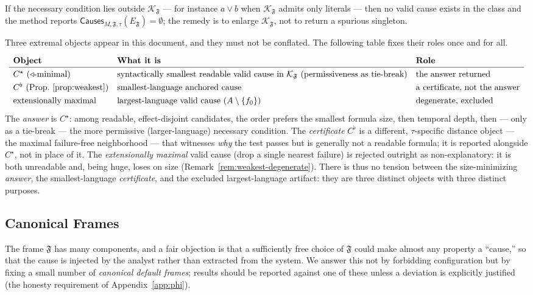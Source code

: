 \documentclass[11pt]{article}
\theoremstyle{remark}
\newcommand{\Frame}{\mathfrak{F}}
\begin{document}
If the necessary condition lies outside \(\mathcal{K}_{\Frame}\) --- for
instance \(a\lor b\) when \(\mathcal{K}_{\Frame}\) admits only literals --- then
no valid cause exists in the class and the method reports
\(\mathsf{Causes}_{M,\Frame,\tau}(E_{\Frame})=\emptyset\); the remedy is to
enlarge \(\mathcal{K}_{\Frame}\), not to return a spurious singleton.

Three extremal objects appear in this document, and they must not be conflated.
The following table fixes their roles once and for all.
\[
\renewcommand{\arraystretch}{1.3}
\begin{array}{lll}
  \textbf{Object} & \textbf{What it is} & \textbf{Role}\\
  \hline
  C^{\star}\ (\triangleleft\text{-minimal}) &
    \text{syntactically smallest readable valid cause in }\mathcal{K}_{\Frame}
    \text{ (permissiveness as tie-break)} &
    \text{the answer returned}\\
  C^{\flat}\ (\text{Prop.~\ref{prop:weakest}}) &
    \text{smallest-language anchored cause} &
    \text{a certificate, not the answer}\\
  \text{extensionally maximal} &
    \text{largest-language valid cause }(A\setminus\{f_0\}) &
    \text{degenerate, excluded}
\end{array}
\]
The \emph{answer} is \(C^{\star}\): among readable, effect-disjoint candidates,
the order prefers the smallest formula size, then temporal depth, then --- only as
a tie-break --- the more permissive (larger-language) necessary condition. The
\emph{certificate} \(C^{\flat}\) is a different, \(\tau\)-specific distance object
--- the maximal failure-free neighborhood --- that witnesses \emph{why} the test
passes but is generally not a readable formula; it is reported alongside
\(C^{\star}\), not in place of it. The \emph{extensionally maximal} valid cause
(drop a single nearest failure) is rejected outright as non-explanatory: it is
both unreadable and, being huge, loses on size (Remark~\ref{rem:weakest-degenerate}).
There is thus no tension between the size-minimizing \emph{answer}, the
smallest-language \emph{certificate}, and the excluded largest-language artifact:
they are three distinct objects with three distinct purposes.

\subsection{Canonical Frames}
\label{sec:canonical-frames}

The frame \(\Frame\) has many components, and a fair objection is that a
sufficiently free choice of \(\Frame\) could make almost any property a
``cause,'' so that the cause is injected by the analyst rather than extracted
from the system. We answer this not by forbidding configuration but by fixing
a small number of \emph{canonical default frames}; results should be reported
against one of these unless a deviation is explicitly justified (the honesty
requirement of Appendix~\ref{app:phi}).
\end{document}

